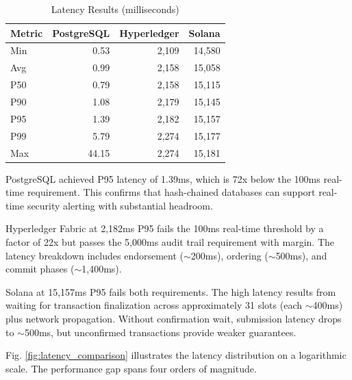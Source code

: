 \documentclass[conference]{IEEEtran}
\begin{document}
\begin{table}[htbp]
\caption{Latency Results (milliseconds)}
\label{tab:latency_results}
\centering
\begin{tabular}{lrrr}
\toprule
\textbf{Metric} & \textbf{PostgreSQL} & \textbf{Hyperledger} & \textbf{Solana} \\
\midrule
Min & 0.53 & 2,109 & 14,580 \\
Avg & 0.99 & 2,158 & 15,058 \\
P50 & 0.79 & 2,158 & 15,115 \\
P90 & 1.08 & 2,179 & 15,145 \\
P95 & 1.39 & 2,182 & 15,157 \\
P99 & 5.79 & 2,274 & 15,177 \\
Max & 44.15 & 2,274 & 15,181 \\
\bottomrule
\end{tabular}
\end{table}

PostgreSQL achieved P95 latency of 1.39ms, which is 72x below the 100ms real-time requirement. This confirms that hash-chained databases can support real-time security alerting with substantial headroom.

Hyperledger Fabric at 2,182ms P95 fails the 100ms real-time threshold by a factor of 22x but passes the 5,000ms audit trail requirement with margin. The latency breakdown includes endorsement ($\sim$200ms), ordering ($\sim$500ms), and commit phases ($\sim$1,400ms).

Solana at 15,157ms P95 fails both requirements. The high latency results from waiting for transaction finalization across approximately 31 slots (each $\sim$400ms) plus network propagation. Without confirmation wait, submission latency drops to $\sim$500ms, but unconfirmed transactions provide weaker guarantees.

Fig. \ref{fig:latency_comparison} illustrates the latency distribution on a logarithmic scale. The performance gap spans four orders of magnitude.
\end{document}
